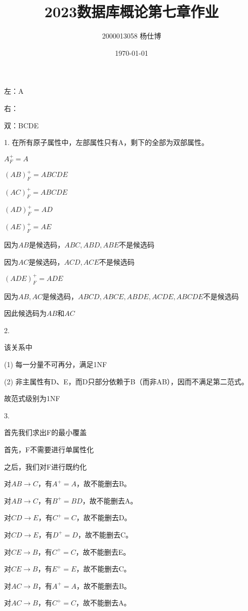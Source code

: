 \documentclass[UTF8]{ctexart}
\title{\vspace{-4cm}2023数据库概论第七章作业}
\author{2000013058 杨仕博}
\date{\today}
\begin{document}
\maketitle

\subsection{}

左：A

右：

双：BCDE

1. 在所有原子属性中，左部属性只有A，剩下的全部为双部属性。

$A_F^+ = A$

$(AB)_F^+ = ABCDE$

$(AC)_F^+ = ABCDE$

$(AD)_F^+ = AD$

$(AE)_F^+ = AE$

因为$AB$是候选码，$ABC, ABD, ABE$不是候选码

因为$AC$是候选码，$ACD, ACE$不是候选码

$(ADE)_F^+ = ADE$

因为$AB, AC$是候选码，$ABCD, ABCE, ABDE, ACDE, ABCDE$不是候选码

因此候选码为$AB$和$AC$

2. 

该关系中

(1) 每一分量不可再分，满足1NF

(2) 非主属性有D、E，而D只部分依赖于B（而非AB），因而不满足第二范式。

故范式级别为1NF

3. 

首先我们求出F的最小覆盖

首先，F不需要进行单属性化

之后，我们对F进行既约化

对$AB\rightarrow C$，有$A^+ = A$，故不能删去B。

对$AB\rightarrow C$，有$B^+ = BD$，故不能删去A。

对$CD\rightarrow E$，有$C^+ = C$，故不能删去D。

对$CD\rightarrow E$，有$D^+ = D$，故不能删去C。

对$CE\rightarrow B$，有$C^+ = C$，故不能删去E。

对$CE\rightarrow B$，有$E^+ = E$，故不能删去C。

对$AC\rightarrow B$，有$A^+ = A$，故不能删去B。

对$AC\rightarrow B$，有$C^+ = C$，故不能删去A。
\end{document}
